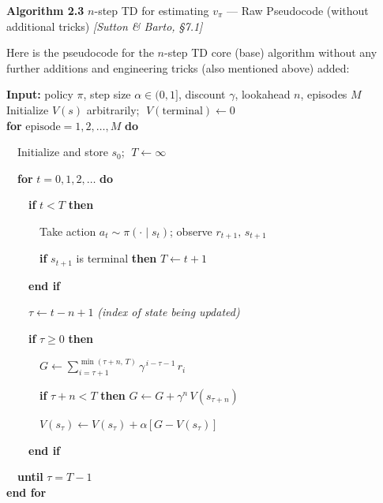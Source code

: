 \documentclass[11pt]{article}
\begin{document}
    \label{pseudo-2-3}

    \begin{pseudobox}

\textbf{Algorithm 2.3} \(n\)-step TD for estimating \(v_\pi\) --- Raw
Pseudocode (without additional tricks) \emph{{[}Sutton \& Barto,
§7.1{]}}

\tcbline

Here is the pseudocode for the \(n\)-step TD core (base) algorithm
without any further additions and engineering tricks (also mentioned
above) added:

\textbf{Input:} policy \(\pi\), step size \(\alpha \in (0, 1]\),
discount \(\gamma\), lookahead \(n\), episodes \(M\)\\
Initialize \(V(s)\) arbitrarily; \(\;V(\text{terminal}) \leftarrow 0\)\\
\textbf{for} \(\text{episode} = 1, 2, \ldots, M\) \textbf{do}\\
\strut ~~Initialize and store \(s_0\); \(\;T \leftarrow \infty\)\\
\strut ~~\textbf{for} \(t = 0, 1, 2, \ldots\) \textbf{do}\\
\strut ~~~~\textbf{if} \(t < T\) \textbf{then}\\
\strut ~~~~~~Take action \(a_t \sim \pi(\cdot \mid s_t)\); observe
\(r_{t+1},\, s_{t+1}\)\\
\strut ~~~~~~\textbf{if} \(s_{t+1}\) is terminal \textbf{then}
\(T \leftarrow t + 1\)\\
\strut ~~~~\textbf{end if}\\
\strut ~~~~\(\tau \leftarrow t - n + 1\) \emph{(index of state being
updated)}\\
\strut ~~~~\textbf{if} \(\tau \geq 0\) \textbf{then}\\
\strut ~~~~~~\(G \leftarrow \displaystyle\sum_{i=\tau+1}^{\min(\tau+n,\, T)} \gamma^{\,i - \tau - 1}\, r_i\)\\
\strut ~~~~~~\textbf{if} \(\tau + n < T\) \textbf{then}
\(G \leftarrow G + \gamma^{n}\, V(s_{\tau + n})\)\\
\strut ~~~~~~\(V(s_\tau) \leftarrow V(s_\tau) + \alpha\,\bigl[\, G - V(s_\tau) \,\bigr]\)\\
\strut ~~~~\textbf{end if}\\
\strut ~~\textbf{until} \(\tau = T - 1\)\\
\textbf{end for}

\end{pseudobox}
\end{document}
